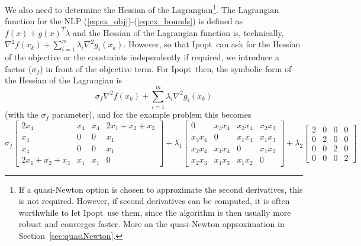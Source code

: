 \documentclass[10pt]{article}
\newcommand{\Ipopt}{{\sc Ipopt}}
\begin{document}
We also need to determine the Hessian of the Lagrangian\footnote{If a
  quasi-Newton option is chosen to approximate the second derivatives,
  this is not required.  However, if second derivatives can be
  computed, it is often worthwhile to let \Ipopt\ use them, since the
  algorithm is then usually more robust and converges faster.  More on
  the quasi-Newton approximation in Section~\ref{sec:quasiNewton}.}.
The Lagrangian function for the NLP
(\ref{eq:ex_obj})-(\ref{eq:ex_bounds}) is defined as $f(x) + g(x)^T
\lambda$ and the Hessian of the Lagrangian function is, technically, $
\nabla^2 f(x_k) + \sum_{i=1}^m\lambda_i\nabla^2 g_i(x_k)$.  However,
so that \Ipopt\ can ask for the Hessian of the objective or the
constraints independently if required, we introduce a factor
($\sigma_f$) in front of the objective term.
%
For \Ipopt\ then, the symbolic form of the Hessian of the
Lagrangian is
\begin{equation}\label{eq:IpoptLAG}
\sigma_f \nabla^2 f(x_k) + \sum_{i=1}^m\lambda_i\nabla^2 g_i(x_k)
\end{equation}
(with the $\sigma_f$ parameter), and for the example problem this becomes
\[%
\sigma_f \left[
\begin{array}{cccc}
2 x_4           & x_4           & x_4           & 2 x_1 + x_2 + x_3     \\
x_4             & 0             & 0             & x_1                   \\
x_4             & 0             & 0             & x_1                   \\
2 x_1+x_2+x_3   & x_1           & x_1           & 0
\end{array}
\right]
+
\lambda_1
\left[
\begin{array}{cccc}
0               & x_3 x_4       & x_2 x_4       & x_2 x_3       \\
x_3 x_4         & 0             & x_1 x_4       & x_1 x_3       \\
x_2 x_4         & x_1 x_4       & 0             & x_1 x_2       \\
x_2 x_3         & x_1 x_3       & x_1 x_2       & 0 
\end{array}
\right]
+
\lambda_2
\left[
\begin{array}{cccc}
2       & 0     & 0     & 0     \\
0       & 2     & 0     & 0     \\
0       & 0     & 2     & 0     \\
0       & 0     & 0     & 2
\end{array}
\right]
\]%
\end{document}
